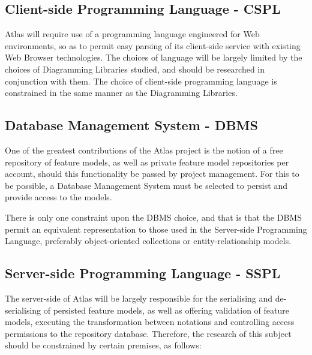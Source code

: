 
\subsection{Client-side Programming Language - CSPL}

Atlas will require use of a programming language engineered for Web environments, so as to permit easy parsing of its client-side service with existing Web Browser technologies. The choices of language will be largely limited by the choices of Diagramming Libraries studied, and should be researched in conjunction with them. The choice of client-side programming language is constrained in the same manner as the Diagramming Libraries.


\subsection{Database Management System - DBMS}

One of the greatest contributions of the Atlas project is the notion of a free repository of feature models, as well as private feature model repositories per account, should this functionality be passed by project management. For this to be possible, a Database Management System must be selected to persist and provide access to the models.

There is only one constraint upon the DBMS choice, and that is that the DBMS permit an equivalent representation to those used in the Server-side Programming Language, preferably object-oriented collections or entity-relationship models.


\subsection{Server-side Programming Language - SSPL}

The server-side of Atlas will be largely responsible for the serialising and de-serialising of persisted feature models, as well as offering validation of feature models, executing the transformation between notations and controlling access permissions to the repository database. Therefore, the research of this subject should be constrained by certain premises, as follows:


